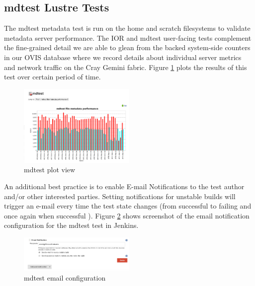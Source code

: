 \documentclass[10pt, conference, compsocconf]{IEEEtran}
\begin{document}
\subsection{mdtest Lustre Tests}
The mdtest metadata test is run on the home and scratch filesystems to validate metadata server performance.  The IOR and mdtest user-facing tests complement the fine-grained detail we are able to glean from the backed system-side counters in our OVIS database where we record details about individual server metrics and network traffic on the Cray Gemini fabric. Figure \ref{fig:mdtest-plot} plots the results of this test over certain period of time. 
\begin{figure}[H]
\centering
\includegraphics[width=0.5\textwidth]{mdtest-plot}
\caption{mdtest plot view }
\label{fig:mdtest-plot}
\end{figure}

An additional best practice is to enable E-mail Notifications to the test author and/or other interested parties. Setting notifications for unstable builds will trigger an e-mail every time the test state changes (from successful to failing and once again when successful ). Figure \ref{fig:mdtest-config-email} shows screenshot of the email notification configuration for the mdtest test in Jenkins.
\begin{figure}[H]
\centering
\includegraphics[width=0.5\textwidth]{mdtest-config-email}
\caption{ mdtest email configuration }
\label{fig:mdtest-config-email}
\end{figure}
\end{document}
